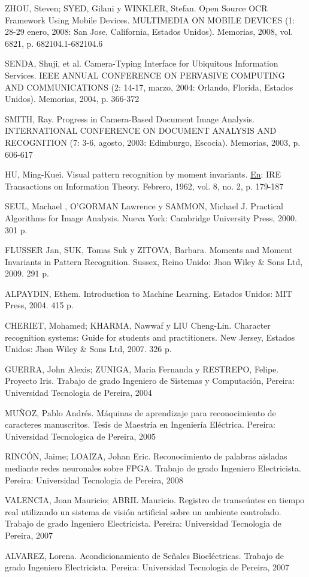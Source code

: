 \documentclass[a4paper, 11pt, oneside]{article}
\begin{document}
	ZHOU, Steven; SYED, Gilani y WINKLER, Stefan. Open Source OCR Framework Using Mobile Devices. MULTIMEDIA ON MOBILE DEVICES (1: 28-29 enero, 2008: San Jose, California, Estados Unidos). Memorias, 2008, vol. 6821, p. 682104.1-682104.6
	
	SENDA, Shuji, et al. Camera-Typing Interface for Ubiquitous Information Services. IEEE ANNUAL CONFERENCE ON PERVASIVE COMPUTING AND COMMUNICATIONS (2: 14-17, marzo, 2004: Orlando, Florida, Estados Unidos). Memorias, 2004, p. 366-372
	
	SMITH, Ray. Progress in Camera-Based Document Image Analysis. INTERNATIONAL CONFERENCE ON DOCUMENT ANALYSIS AND RECOGNITION (7: 3-6, agosto, 2003: Edimburgo, Escocia). Memorias, 2003, p. 606-617
	
	HU, Ming-Kuei. Visual pattern recognition by moment invariants. \underline{En}: IRE Transactions on Information Theory. Febrero, 1962, vol. 8, no. 2, p. 179-187
	
	SEUL, Machael , O'GORMAN Lawrence y SAMMON, Michael J. Practical Algorithms for Image Analysis. Nueva York: Cambridge University Press, 2000. 301 p.
	
	FLUSSER Jan, SUK, Tomas Suk y ZITOVA, Barbara. Moments and Moment Invariants in Pattern Recognition. Sussex, Reino Unido: Jhon Wiley \& Sons Ltd, 2009. 291 p.
	
	ALPAYDIN, Ethem. Introduction to Machine Learning. Estados Unidos: MIT Press, 2004. 415 p.
	
	CHERIET, Mohamed; KHARMA, Nawwaf y LIU Cheng-Lin. Character recognition systems: Guide for students and practitioners. New Jersey, Estados Unidos: Jhon Wiley \& Sons Ltd, 2007. 326 p.
	
	GUERRA, John Alexis; ZUNIGA, Maria Fernanda y RESTREPO, Felipe. Proyecto Iris. Trabajo de grado Ingeniero de Sistemas y Computación, Pereira: Universidad Tecnologia de Pereira, 2004
	
	MUÑOZ, Pablo Andrés. Máquinas de aprendizaje para reconocimiento de caracteres manuscritos. Tesis de Maestría en Ingeniería Eléctrica. Pereira: Universidad Tecnologica de Pereira, 2005
	
	RINCÓN, Jaime; LOAIZA, Johan Eric. Reconocimiento de palabras aisladas mediante redes neuronales sobre FPGA. Trabajo de grado Ingeniero Electricista. Pereira: Universidad Tecnologia de Pereira, 2008
	
	VALENCIA, Joan Mauricio; ABRIL Mauricio. Registro de transeúntes en tiempo real utilizando un sistema de visión artificial sobre un ambiente controlado. Trabajo de grado Ingeniero Electricista. Pereira: Universidad Tecnologia de Pereira, 2007
	
	ALVAREZ, Lorena. Acondicionamiento de Señales Bioeléctricas. Trabajo de grado Ingeniero Electricista. Pereira: Universidad Tecnologia de Pereira, 2007
	
	\clearpage
\end{document}
